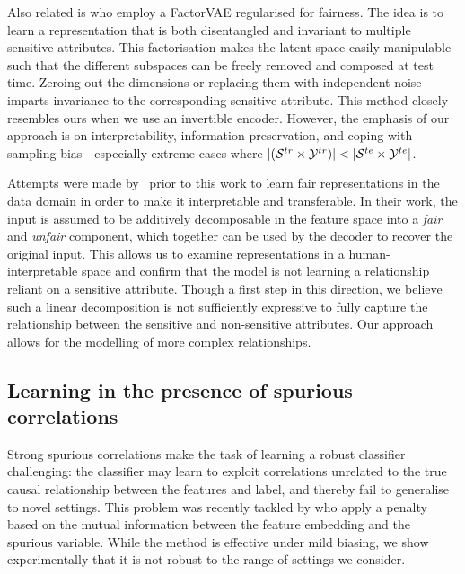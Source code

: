 Also related is \citet{creager2019flexibly} who employ a FactorVAE \citep{kim2018disentangling}
regularised for fairness. The idea is to learn a representation that is both disentangled and
invariant to multiple sensitive attributes. This factorisation makes the latent space easily
manipulable such that the different subspaces can be freely removed and composed at test time.
Zeroing out the dimensions or replacing them with independent noise imparts invariance to the
corresponding sensitive attribute. This method closely resembles ours when we use an invertible
encoder. However, the emphasis of our approach is on interpretability, information-preservation,
and coping with sampling bias - especially extreme cases where \( |({\mathcal{S}}^{tr} \times {\mathcal{Y}}^{tr}) | < |
{\mathcal{S}}^{te} \times {\mathcal{Y}}^{te} | \).

Attempts were made by~\citet{QuaShaTho19} prior to this work to learn fair representations in the
data domain in order to make it interpretable and transferable. In their work, the input is assumed
to be additively decomposable in the feature space into a \emph{fair} and \emph{unfair} component,
which together can be used by the decoder to recover the original input. This allows us to examine
representations in a human-interpretable space and confirm that the model is not learning a
relationship reliant on a sensitive attribute. Though a first step in this direction, we believe
such a linear decomposition is not sufficiently expressive to fully capture the relationship
between the sensitive and non-sensitive attributes. Our approach allows for the modelling of more
complex relationships.

\subsection{Learning in the presence of spurious correlations}
Strong spurious correlations make the task of learning a robust classifier challenging: the
classifier may learn to exploit correlations unrelated to the true causal relationship between the
features and label, and thereby fail to generalise to novel settings. This problem was recently
tackled by \citet{kim2019learning} who apply a penalty based on the mutual information between the
feature embedding and the spurious variable. While the method is effective under mild biasing, we
show experimentally that it is not robust to the range of settings we consider.

